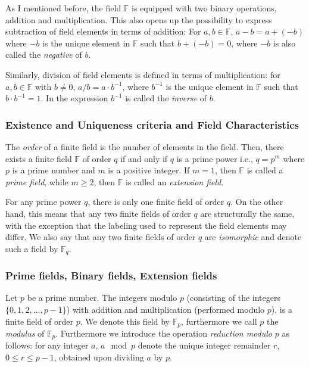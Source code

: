 As I mentioned before, the  field $\mathbb{F}$ is equipped with two binary operations, addition and multiplication. This also opens up the possibility to express subtraction of field elements in terms of addition: For $a, b \in \mathbb{F}$,  $a - b = a + (-b)$  where $-b$ is the unique element in $\mathbb{F}$ such that $b + (-b) = 0$, where  $-b$ is also called the \textit{negative} of $b$. 

Similarly, division of field elements is defined in terms of multiplication: for $a, b \in \mathbb{F}$ with $b \neq 0$,
$a / b = a \cdot b^{-1}$, where $b^{-1}$ is the unique element in $\mathbb{F}$ such that $b \cdot b^{-1} = 1$. In the expression $b^{-1}$ is called the \textit{inverse} of $b$. 

\subsubsection{Existence and Uniqueness criteria and Field Characteristics}
\label{sssec:ch01.existenceUniqueness}

The \textit{order} of a finite field is the number of elements in the field. Then, there exists a finite field $\mathbb{F}$ of order $q$ if and only if $q$ is a prime power i.e., $q = p^m$ where $p$ is a prime number and $m$ is a positive integer. If $m = 1$, then $\mathbb{F}$ is called a \textit{prime field}, while $m \geq 2$, then $\mathbb{F}$ is called an \textit{extension field}. 



For any prime power $q$, there is only one finite field of order $q$.  On the other hand, this means that any two finite fields of order $q$ are structurally the same, with the exception that the labeling used to represent the field elements may differ. We also say that any two finite fields of order $q$ are \textit{isomorphic} and denote such a field by $\mathbb{F}_q$.

\subsubsection{Prime fields, Binary fields, Extension fields}
\label{sssec:ch01.primefieldsbinaryfieldsextensionfield}


Let $p$ be a prime number. The integers modulo $p$ (consisting of the integers $\{0, 1, 2, \ldots, p-1\}$) with addition and multiplication (performed modulo $p$), is a finite field of order $p$. We denote this field by $\mathbb{F}_p$, furthermore we call $p$ the \textit{modulus} of $\mathbb{F}_p$. Furthermore we introduce the operation \textit{reduction modulo} $p$ as follows: for any integer $a$, $a \mod p$ denote the unique integer remainder $r$, $0 \leq r \leq p-1$, obtained upon dividing $a$ by $p$. 

